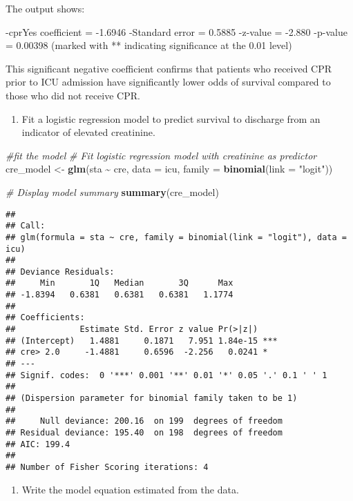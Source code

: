 \documentclass[
]{article}
\newenvironment{Shaded}{\begin{snugshade}}{\end{snugshade}}
\newcommand{\AttributeTok}[1]{\textcolor[rgb]{0.13,0.29,0.53}{#1}}
\newcommand{\CommentTok}[1]{\textcolor[rgb]{0.56,0.35,0.01}{\textit{#1}}}
\newcommand{\FunctionTok}[1]{\textcolor[rgb]{0.13,0.29,0.53}{\textbf{#1}}}
\newcommand{\NormalTok}[1]{#1}
\newcommand{\OtherTok}[1]{\textcolor[rgb]{0.56,0.35,0.01}{#1}}
\newcommand{\SpecialCharTok}[1]{\textcolor[rgb]{0.81,0.36,0.00}{\textbf{#1}}}
\newcommand{\StringTok}[1]{\textcolor[rgb]{0.31,0.60,0.02}{#1}}
\providecommand{\tightlist}{%
  \setlength{\itemsep}{0pt}\setlength{\parskip}{0pt}}
\begin{document}
The output shows:

-cprYes coefficient = -1.6946 -Standard error = 0.5885 -z-value = -2.880
-p-value = 0.00398 (marked with ** indicating significance at the 0.01
level)

This significant negative coefficient confirms that patients who
received CPR prior to ICU admission have significantly lower odds of
survival compared to those who did not receive CPR.

\begin{enumerate}
\def\labelenumi{\arabic{enumi}.}
\setcounter{enumi}{3}
\tightlist
\item
  Fit a logistic regression model to predict survival to discharge from
  an indicator of elevated creatinine.
\end{enumerate}

\begin{Shaded}
\begin{Highlighting}[]
\CommentTok{\#fit the model}
\CommentTok{\# Fit logistic regression model with creatinine as predictor}
\NormalTok{cre\_model }\OtherTok{\textless{}{-}} \FunctionTok{glm}\NormalTok{(sta }\SpecialCharTok{\textasciitilde{}}\NormalTok{ cre, }\AttributeTok{data =}\NormalTok{ icu, }\AttributeTok{family =} \FunctionTok{binomial}\NormalTok{(}\AttributeTok{link =} \StringTok{"logit"}\NormalTok{))}

\CommentTok{\# Display model summary}
\FunctionTok{summary}\NormalTok{(cre\_model)}
\end{Highlighting}
\end{Shaded}

\begin{verbatim}
## 
## Call:
## glm(formula = sta ~ cre, family = binomial(link = "logit"), data = icu)
## 
## Deviance Residuals: 
##     Min       1Q   Median       3Q      Max  
## -1.8394   0.6381   0.6381   0.6381   1.1774  
## 
## Coefficients:
##             Estimate Std. Error z value Pr(>|z|)    
## (Intercept)   1.4881     0.1871   7.951 1.84e-15 ***
## cre> 2.0     -1.4881     0.6596  -2.256   0.0241 *  
## ---
## Signif. codes:  0 '***' 0.001 '**' 0.01 '*' 0.05 '.' 0.1 ' ' 1
## 
## (Dispersion parameter for binomial family taken to be 1)
## 
##     Null deviance: 200.16  on 199  degrees of freedom
## Residual deviance: 195.40  on 198  degrees of freedom
## AIC: 199.4
## 
## Number of Fisher Scoring iterations: 4
\end{verbatim}

\begin{enumerate}
\def\labelenumi{\alph{enumi})}
\tightlist
\item
  Write the model equation estimated from the data.
\end{enumerate}
\end{document}
